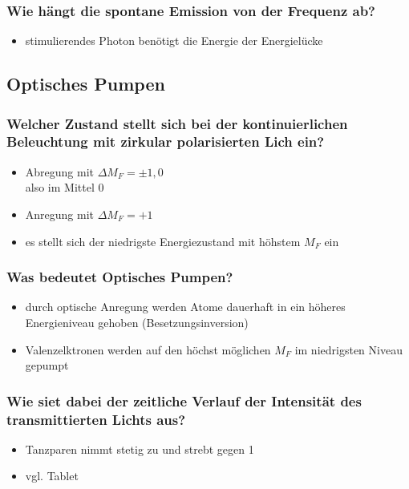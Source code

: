 \subsubsection[]{Wie hängt die spontane Emission von der Frequenz ab?}
\begin{itemize}
    \item stimulierendes Photon benötigt die Energie der Energielücke
\end{itemize}

\subsection{Optisches Pumpen}
\subsubsection[]{Welcher Zustand stellt sich bei der kontinuierlichen Beleuchtung mit zirkular polarisierten Lich ein?}
\begin{itemize}
    \item Abregung mit $\Delta M_F=\pm 1, 0$ \\
    \to also im Mittel 0
    \item Anregung mit $\Delta M_F=+1$
    \item es stellt sich der niedrigste Energiezustand mit höhstem $M_F$ ein
\end{itemize}
\subsubsection[]{Was bedeutet Optisches Pumpen?}
\begin{itemize}
    \item durch optische Anregung werden Atome dauerhaft in ein höheres Energieniveau gehoben (Besetzungsinversion)
    \item Valenzelktronen werden auf den höchst möglichen $M_F$ im niedrigsten Niveau gepumpt
\end{itemize}
\subsubsection[]{Wie siet dabei der zeitliche Verlauf der Intensität des transmittierten Lichts aus?}
\begin{itemize}
    \item Tanzparen nimmt stetig zu und strebt gegen 1
    \item vgl. Tablet
\end{itemize}

